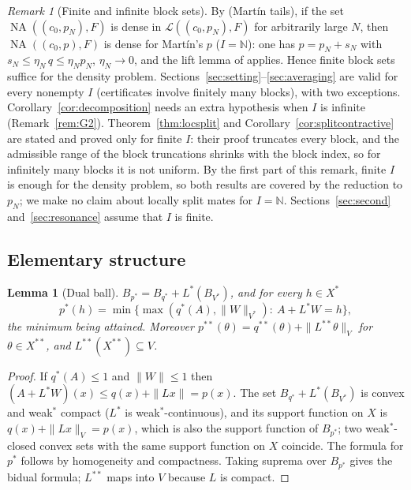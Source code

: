\documentclass[10pt]{amsart}
\newtheorem{lemma}[theorem]{Lemma}
\theoremstyle{definition}
\theoremstyle{remark}
\newtheorem{remark}[theorem]{Remark}
\newcommand{\NA}{\operatorname{NA}}
\newcommand{\N}{\mathbb N}
\begin{document}
\begin{remark}[Finite and infinite block sets]\label{rem:blocks}
By \cite[Remark~6.9]{PrB} (Mart\'in tails), if the set
$\NA((c_0,p_N),F)$ is dense in $\mathcal L((c_0,p_N),F)$ for arbitrarily
large $N$, then
$\NA((c_0,p),F)$ is dense for Mart\'in's $p$ ($I=\N$): one has
$p=p_N+s_N$ with $s_N\le\eta_N\,q\le\eta_Np_N$, $\eta_N\to0$, and the
lift lemma of \cite{PrB} applies.  Hence finite block sets suffice for the
density problem.  Sections~\ref{sec:setting}--\ref{sec:averaging} are
valid for every nonempty $I$ (certificates involve finitely many blocks),
with two exceptions.  Corollary~\ref{cor:decomposition} needs an extra
hypothesis when $I$ is infinite (Remark~\ref{rem:G2}).
Theorem~\ref{thm:locsplit} and Corollary~\ref{cor:splitcontractive} are
stated and proved only for finite $I$: their proof truncates every block,
and the admissible range of the block truncations shrinks with the block
index, so for infinitely many blocks it is not uniform.  By the first
part of this remark, finite $I$ is enough for the density problem, so
both results are covered by the reduction to $p_N$; we make no claim about
locally split mates for $I=\N$.  Sections~\ref{sec:second}
and~\ref{sec:resonance} assume that $I$ is finite.
\end{remark}

\subsection{Elementary structure}

\begin{lemma}[Dual ball]\label{lem:dualball}
$B_{p^*}=B_{q^*}+L^*(B_{V^*})$, and for every $h\in X^*$
\[
 p^*(h)=\min\{\max(q^*(A),\|W\|_{V^*}):\ A+L^*W=h\},
\]
the minimum being attained.  Moreover $p^{**}(\theta)=q^{**}(\theta)+
\|L^{**}\theta\|_V$ for $\theta\in X^{**}$, and $L^{**}(X^{**})\subseteq V$.
\end{lemma}

\begin{proof}
If $q^*(A)\le1$ and $\|W\|\le1$ then $(A+L^*W)(x)\le q(x)+\|Lx\|=p(x)$.
The set $B_{q^*}+L^*(B_{V^*})$ is convex and weak$^*$ compact ($L^*$ is
weak$^*$-continuous), and its support function on $X$ is
$q(x)+\|Lx\|_V=p(x)$, which is also the support function of $B_{p^*}$; two
weak$^*$-closed convex sets with the same support function on $X$
coincide.  The formula for $p^*$ follows by homogeneity and compactness.
Taking suprema over $B_{p^*}$ gives the bidual formula; $L^{**}$ maps into
$V$ because $L$ is compact.
\end{proof}
\end{document}
